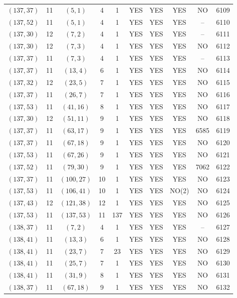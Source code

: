 \begin{longtable}{|c|c|c|c|c|c|c|c|c|c|}
$(137, 37)$ & 11 & $(5, 1)$ & 4 & 1 & YES & YES & YES & NO & 6109\\
$(137, 52)$ & 11 & $(5, 1)$ & 4 & 1 & YES & YES & YES & -- & 6110\\
$(137, 30)$ & 12 & $(7, 2)$ & 4 & 1 & YES & YES & YES & -- & 6111\\
$(137, 30)$ & 12 & $(7, 3)$ & 4 & 1 & YES & YES & YES & NO & 6112\\
$(137, 37)$ & 11 & $(7, 3)$ & 4 & 1 & YES & YES & YES & -- & 6113\\
$(137, 37)$ & 11 & $(13, 4)$ & 6 & 1 & YES & YES & YES & NO & 6114\\
$(137, 32)$ & 12 & $(23, 5)$ & 7 & 1 & YES & YES & YES & NO & 6115\\
$(137, 37)$ & 11 & $(26, 7)$ & 7 & 1 & YES & YES & YES & NO & 6116\\
$(137, 53)$ & 11 & $(41, 16)$ & 8 & 1 & YES & YES & YES & NO & 6117\\
$(137, 30)$ & 12 & $(51, 11)$ & 9 & 1 & YES & YES & YES & NO & 6118\\
$(137, 37)$ & 11 & $(63, 17)$ & 9 & 1 & YES & YES & YES & 6585 & 6119\\
$(137, 37)$ & 11 & $(67, 18)$ & 9 & 1 & YES & YES & YES & NO & 6120\\
$(137, 53)$ & 11 & $(67, 26)$ & 9 & 1 & YES & YES & YES & NO & 6121\\
$(137, 52)$ & 11 & $(79, 30)$ & 9 & 1 & YES & YES & YES & 7062 & 6122\\
$(137, 37)$ & 11 & $(100, 27)$ & 10 & 1 & YES & YES & YES & NO & 6123\\
$(137, 53)$ & 11 & $(106, 41)$ & 10 & 1 & YES & YES & NO(2) & NO & 6124\\
$(137, 43)$ & 12 & $(121, 38)$ & 12 & 1 & YES & YES & YES & NO & 6125\\
$(137, 53)$ & 11 & $(137, 53)$ & 11 & 137 & YES & YES & YES & NO & 6126\\
$(138, 37)$ & 11 & $(7, 2)$ & 4 & 1 & YES & YES & YES & -- & 6127\\
$(138, 41)$ & 11 & $(13, 3)$ & 6 & 1 & YES & YES & YES & NO & 6128\\
$(138, 41)$ & 11 & $(23, 7)$ & 7 & 23 & YES & YES & YES & NO & 6129\\
$(138, 41)$ & 11 & $(25, 7)$ & 7 & 1 & YES & YES & YES & NO & 6130\\
$(138, 41)$ & 11 & $(31, 9)$ & 8 & 1 & YES & YES & YES & NO & 6131\\
$(138, 37)$ & 11 & $(67, 18)$ & 9 & 1 & YES & YES & YES & NO & 6132\\

\end{longtable}
